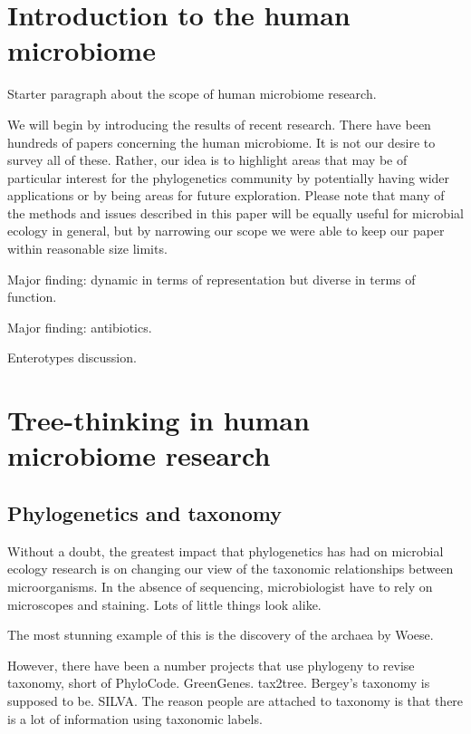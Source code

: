 \documentclass{amsart}
\newcommand{\notforarxiv}[1]{}
\begin{document}
\notforarxiv{
\noindent (Keywords: human microbiome; microbial ecology; zzz)\\
\vspace{1.5in}
}

\section{Introduction to the human microbiome}

Starter paragraph about the scope of human microbiome research.

We will begin by introducing the results of recent research.
There have been hundreds of papers concerning the human microbiome.
It is not our desire to survey all of these.
Rather, our idea is to highlight areas that may be of particular interest for the phylogenetics community by potentially having wider applications or by being areas for future exploration.
Please note that many of the methods and issues described in this paper will be equally useful for microbial ecology in general, but by narrowing our scope we were able to keep our paper within reasonable size limits.

Major finding: dynamic in terms of representation but diverse in terms of function.

Major finding: antibiotics.
\cite{dethlefsen2008pervasive,dethlefsen2011incomplete,jakobsson2010short,jernberg2007long}

Enterotypes discussion.


\section{Tree-thinking in human microbiome research}

\subsection{Phylogenetics and taxonomy}

Without a doubt, the greatest impact that phylogenetics has had on microbial ecology research is on changing our view of the taxonomic relationships between microorganisms.
In the absence of sequencing, microbiologist have to rely on microscopes and staining.
Lots of little things look alike.

The most stunning example of this is the discovery of the archaea by Woese.

However, there have been a number projects that use phylogeny to revise taxonomy, short of PhyloCode.
GreenGenes.
tax2tree.
Bergey's taxonomy is supposed to be.
SILVA.
The reason people are attached to taxonomy is that there is a lot of information using taxonomic labels.
\end{document}
